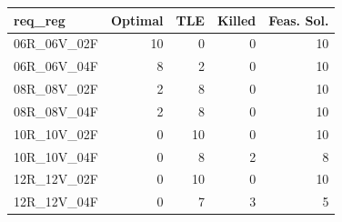 
\begin{tabular}{lrrrr}
\toprule
req\_reg & Optimal & TLE & Killed & Feas. Sol.\\
\midrule
06R\_06V\_02F & 10 & 0 & 0 & 10\\
06R\_06V\_04F & 8 & 2 & 0 & 10\\
08R\_08V\_02F & 2 & 8 & 0 & 10\\
08R\_08V\_04F & 2 & 8 & 0 & 10\\
10R\_10V\_02F & 0 & 10 & 0 & 10\\
\addlinespace
10R\_10V\_04F & 0 & 8 & 2 & 8\\
12R\_12V\_02F & 0 & 10 & 0 & 10\\
12R\_12V\_04F & 0 & 7 & 3 & 5\\
\bottomrule
\end{tabular}
